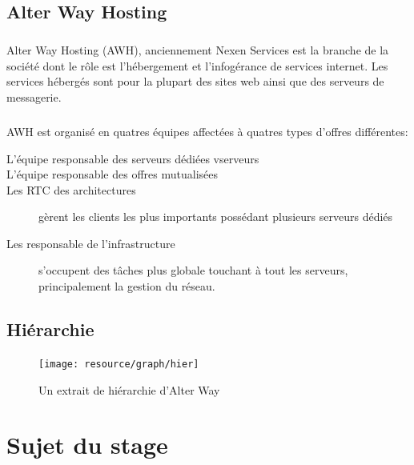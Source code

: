 \section{Alter Way Hosting}
\paragraph*{}
Alter Way Hosting (AWH), anciennement Nexen Services est la branche de la société dont le rôle est l'hébergement et l'infogérance de services internet.
Les services hébergés sont pour la plupart des sites web ainsi que des serveurs de messagerie.

\paragraph*{}
AWH est organisé en quatres équipes affectées à quatres types d'offres différentes:

\begin{description}
	\item[L'équipe responsable des serveurs dédiées vserveurs \footnotemark]
	\item[L'équipe responsable des offres mutualisées
		\footnotemark] 
	\item[Les RTC \footnotemark des architectures] 
		gèrent les clients les plus importants possédant plusieurs serveurs dédiés
	\item[Les responsable de l'infrastructure] s'occupent des tâches plus globale touchant à tout les serveurs,
		principalement la gestion du réseau.

\end{description}


\section{Hiérarchie}

\begin{figure}[H]
	\centering
	\texttt{[image: resource/graph/hier]}
	\caption{Un extrait de hiérarchie d'Alter Way}
\end{figure}

\chapter{Sujet du stage}

